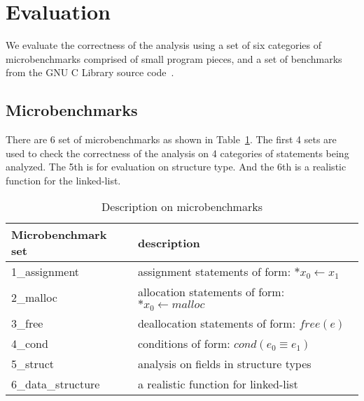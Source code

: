 \section{Evaluation}
\label{s:evaluation}

We evaluate the correctness of the analysis using a set of six categories of 
microbenchmarks comprised of small program pieces, and a set of benchmarks 
from the GNU C Library source code~\cite{glibc}.

\subsection{Microbenchmarks}
\label{microbenchmark}

There are 6 set of microbenchmarks as shown in Table~\ref{tbl:micro}. 
The first 4 sets are used to check the correctness of the analysis on 4 
categories of statements being analyzed. The 5th is for evaluation on 
structure type. And the 6th is a realistic function for the linked-list.



\begin{table}[t!]
  \centering
    \begin{tabular}{|l|l|}
    \hline
    Microbenchmark set & description\\
    \hline
    \hline
    1\_assignment & assignment statements of form: $*x_0\gets x_1$ \\
    \hline
    2\_malloc & allocation statements of form: $*x_0\gets malloc$ \\
    \hline
    3\_free & deallocation statements of form: $free(e)$ \\
    \hline
    4\_cond & conditions of form: $cond(e_0\equiv e_1)$ \\
    \hline
    5\_struct & analysis on fields in structure types \\
    \hline
    6\_data\_structure & a realistic function for linked-list \\
    \hline
    \end{tabular}
    \caption{\label{tbl:micro} Description on microbenchmarks}
\end{table}


